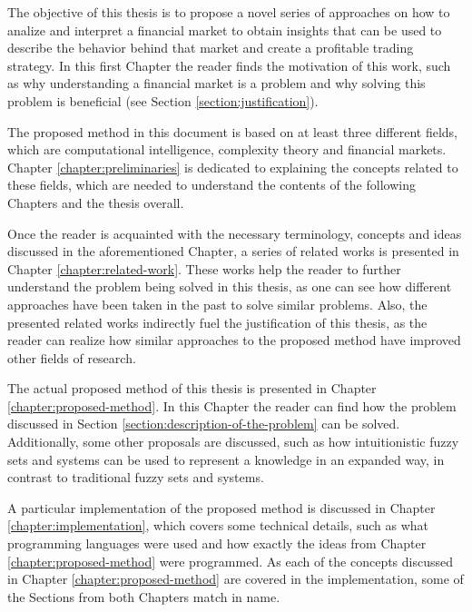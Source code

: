 The objective of this thesis is to propose a novel series of approaches on how
to analize and interpret a financial market to obtain insights that can be
used to describe the behavior behind that market and create a profitable trading
strategy. In this first Chapter the reader finds the motivation of this work,
such as why understanding a financial market is a problem and why solving this
problem is beneficial (see Section \ref{section:justification}).




The proposed method in this document is based on at least three different
fields, which are computational intelligence, complexity theory and financial
markets. Chapter \ref{chapter:preliminaries} is dedicated to explaining the
concepts related to these fields, which are needed to understand the contents of
the following Chapters and the thesis overall.


Once the reader is acquainted with the necessary terminology, concepts and ideas
discussed in the aforementioned Chapter, a series of related works is presented
in Chapter \ref{chapter:related-work}. These works help the reader to further
understand the problem being solved in this thesis, as one can see how different
approaches have been taken in the past to solve similar problems. Also, the
presented related works indirectly fuel the justification of this thesis, as the
reader can realize how similar approaches to the proposed method have improved
other fields of research.

The actual proposed method of this thesis is presented in Chapter
\ref{chapter:proposed-method}. In this Chapter the reader can find how the
problem discussed in Section \ref{section:description-of-the-problem} can be
solved. Additionally, some other proposals are discussed, such as how
intuitionistic fuzzy sets and systems can be used to represent a knowledge in an
expanded way, in contrast to traditional fuzzy sets and systems.

A particular implementation of the proposed method is discussed in Chapter
\ref{chapter:implementation}, which covers some technical details, such as what
programming languages were used and how exactly the ideas from Chapter
\ref{chapter:proposed-method} were programmed. As each of the concepts discussed
in Chapter \ref{chapter:proposed-method} are covered in the implementation, some
of the Sections from both Chapters match in name.

